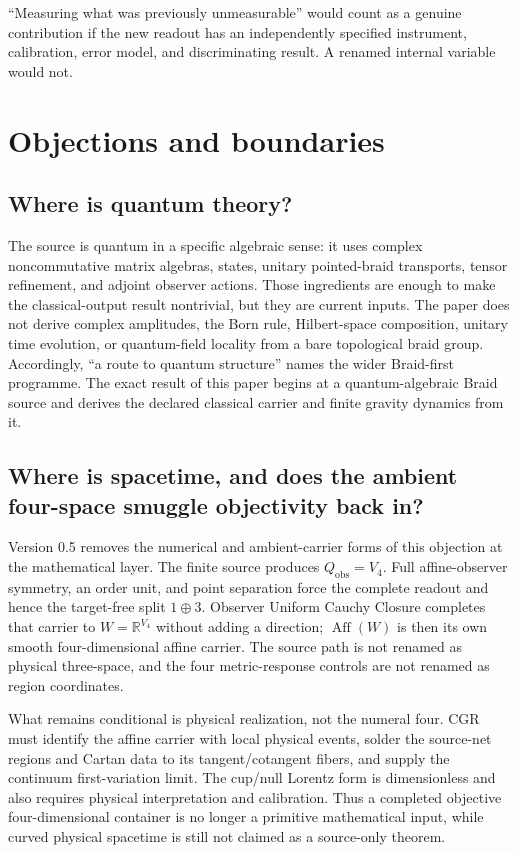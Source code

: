 \documentclass[11pt]{article}
\theoremstyle{definition}
\theoremstyle{remark}
\begin{document}
``Measuring what was previously unmeasurable'' would count as a genuine contribution if the new readout has an independently specified instrument, calibration, error model, and discriminating result. A renamed internal variable would not.

\section{Objections and boundaries}

\subsection{Where is quantum theory?}

The source is quantum in a specific algebraic sense: it uses complex noncommutative matrix algebras, states, unitary pointed-braid transports, tensor refinement, and adjoint observer actions. Those ingredients are enough to make the classical-output result nontrivial, but they are current inputs. The paper does not derive complex amplitudes, the Born rule, Hilbert-space composition, unitary time evolution, or quantum-field locality from a bare topological braid group. Accordingly, ``a route to quantum structure'' names the wider Braid-first programme. The exact result of this paper begins at a quantum-algebraic Braid source and derives the declared classical carrier and finite gravity dynamics from it.

\subsection{Where is spacetime, and does the ambient four-space smuggle objectivity back in?}

Version 0.5 removes the numerical and ambient-carrier forms of this objection at the mathematical layer. The finite source produces $Q_{\mathrm{obs}}=V_4$. Full affine-observer symmetry, an order unit, and point separation force the complete readout and hence the target-free split $1\oplus3$. Observer Uniform Cauchy Closure completes that carrier to $W=\mathbb R^{V_4}$ without adding a direction; $\operatorname{Aff}(W)$ is then its own smooth four-dimensional affine carrier. The source path is not renamed as physical three-space, and the four metric-response controls are not renamed as region coordinates.

What remains conditional is physical realization, not the numeral four. CGR must identify the affine carrier with local physical events, solder the source-net regions and Cartan data to its tangent/cotangent fibers, and supply the continuum first-variation limit. The cup/null Lorentz form is dimensionless and also requires physical interpretation and calibration. Thus a completed objective four-dimensional container is no longer a primitive mathematical input, while curved physical spacetime is still not claimed as a source-only theorem.
\end{document}
